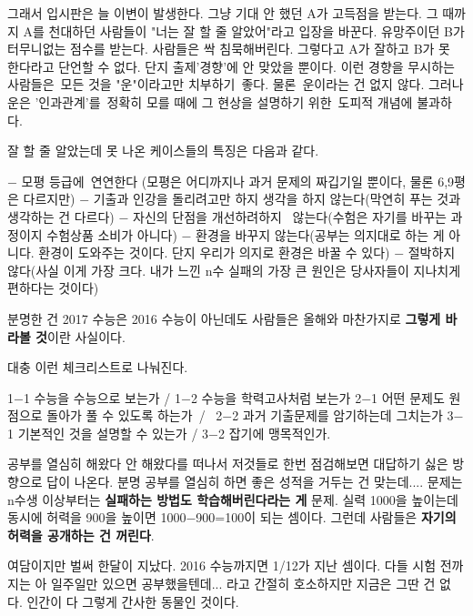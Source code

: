 그래서 입시판은 늘 이변이 발생한다.
그냥 기대 안 했던 A가 고득점을 받는다. 그 때까지 A를 천대하던 사람들이 "너는 잘 할 줄 알았어"라고 입장을 바꾼다.
유망주이던 B가 터무니없는 점수를 받는다. 사람들은 싹 침묵해버린다.
그렇다고 A가 잘하고 B가 못 한다라고 단언할 수 없다. 단지 출제'경향'에 안 맞았을 뿐이다.
이런 경향을 무시하는 사람들은 모든 것을 "운"이라고만 치부하기 좋다.
물론 운이라는 건 없지 않다. 그러나 운은 '인과관계'를 정확히 모를 때에 그 현상을 설명하기 위한 도피적 개념에 불과하다.
\vspace{5mm}

잘 할 줄 알았는데 못 나온 케이스들의 특징은 다음과 같다.
\vspace{5mm}

$-$ 모평 등급에 연연한다 (모평은 어디까지나 과거 문제의 짜깁기일 뿐이다, 물론 6,9평은 다르지만)
$-$ 기출과 인강을 돌리려고만 하지 생각을 하지 않는다(막연히 푸는 것과 생각하는 건 다르다)
$-$ 자신의 단점을 개선하려하지  않는다(수험은 자기를 바꾸는 과정이지 수험상품 소비가 아니다)
$-$ 환경을 바꾸지 않는다(공부는 의지대로 하는 게 아니다. 환경이 도와주는 것이다. 단지 우리가 의지로 환경은 바꿀 수 있다)
$-$ 절박하지 않다(사실 이게 가장 크다. 내가 느낀 n수 실패의 가장 큰 원인은 당사자들이 지나치게 편하다는 것이다)
\vspace{5mm}

분명한 건 2017 수능은 2016 수능이 아닌데도 사람들은 올해와 마찬가지로 \textbf{그렇게 바라볼 것}이란 사실이다.
\vspace{5mm}

대충 이런 체크리스트로 나눠진다.
\vspace{5mm}

1$-$1 수능을 수능으로 보는가 / 1$-$2 수능을 학력고사처럼 보는가
2$-$1 어떤 문제도 원점으로 돌아가 풀 수 있도록 하는가 /  2$-$2 과거 기출문제를 암기하는데 그치는가
3$-$1 기본적인 것을 설명할 수 있는가 / 3$-$2 잡기에 맹목적인가.
\vspace{5mm}

공부를 열심히 해왔다 안 해왔다를 떠나서 저것들로 한번 점검해보면 대답하기 싫은 방향으로 답이 나온다.
분명 공부를 열심히 하면 좋은 성적을 거두는 건 맞는데.... 문제는 n수생 이상부터는 \textbf{실패하는 방법도 학습해버린다라는 게} 문제.
실력 1000을 높이는데 동시에 허력을 900을 높이면 1000$-$900=100이 되는 셈이다.
그런데 사람들은 \textbf{자기의 허력을 공개하는 건 꺼린다}.
\vspace{5mm}

여담이지만 벌써 한달이 지났다. 2016 수능까지면 1/12가 지난 셈이다.
다들 시험 전까지는 아 일주일만 있으면 공부했을텐데... 라고 간절히 호소하지만 지금은 그딴 건 없다.
인간이 다 그렇게 간사한 동물인 것이다.
\vspace{5mm}

